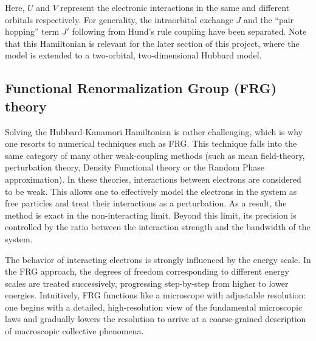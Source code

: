 \documentclass[11pt]{article}
\begin{document}
\noindent Here, $U$ and $V$ represent the electronic interactions in the same and different orbitals respectively. For generality, the intraorbital exchange $J$ and the ``pair hopping'' term $J'$ following from Hund's rule coupling have been separated.  
Note that this Hamiltonian is relevant for the later section of this project, where the model is extended to a two-orbital, two-dimensional Hubbard model.

\subsection{Functional Renormalization Group (FRG) theory}

Solving the Hubbard-Kanamori Hamiltonian is rather challenging, which is why one resorts to numerical techniques such as FRG. This technique falls into the same category of many other weak-coupling methods (such as mean field-theory\cite{kadanoff2009more}, perturbation theory\cite{nagaosa2013quantum}, Density Functional theory\cite{kohn1965self} or the Random Phase approximation\cite{bohm1951collective}).
In these theories, interactions between electrons are considered to be weak. This allows one to effectively model the electrons in the system as free particles 
and treat their interactions as a perturbation. As a result, the method is exact in the non-interacting limit. Beyond this limit, its precision is controlled by the ratio between the interaction
strength and the bandwidth of the system. \par

\medskip

\noindent The behavior of interacting electrons is strongly influenced by the energy scale. In the FRG approach, the degrees of freedom corresponding to different energy scales are treated successively, 
progressing step-by-step from higher to lower energies.
Intuitively, FRG functions like a microscope with adjustable resolution: one begins with a detailed, high-resolution view of the fundamental microscopic laws and gradually lowers the resolution to arrive at a coarse-grained description of macroscopic collective phenomena.
\medskip
\end{document}
